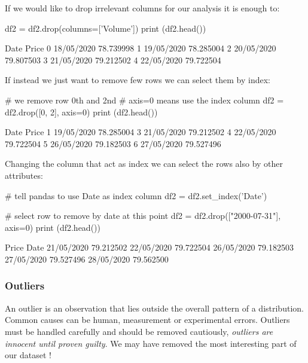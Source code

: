 If we would like to drop irrelevant columns for our analysis it is enough to:

\begin{ipython}
df2 = df2.drop(columns=['Volume'])
print (df2.head())
\end{ipython}
\begin{ioutput}
         Date      Price
0  18/05/2020  78.739998
1  19/05/2020  78.285004
2  20/05/2020  79.807503
3  21/05/2020  79.212502
4  22/05/2020  79.722504
\end{ioutput}
        
If instead we just want to remove few rows we can select them by index:

\begin{ipython}
# we remove row 0th and 2nd
# axis=0 means use the index column
df2 = df2.drop([0, 2], axis=0)
print (df2.head())
\end{ipython}
\begin{ioutput}
         Date      Price
1  19/05/2020  78.285004
3  21/05/2020  79.212502
4  22/05/2020  79.722504
5  26/05/2020  79.182503
6  27/05/2020  79.527496
\end{ioutput}
        
Changing the column that act as index we can select the rows also by other attributes:

\begin{ipython}
# tell pandas to use Date as index column
df2 = df2.set_index('Date')

# select row to remove by date at this point
df2 = df2.drop(["2000-07-31"], axis=0)
print (df2.head())
\end{ipython}
\begin{ioutput}
                Price
Date                 
21/05/2020  79.212502
22/05/2020  79.722504
26/05/2020  79.182503
27/05/2020  79.527496
28/05/2020  79.562500
\end{ioutput}
        
\subsubsection{Outliers}\label{outliers}

An outlier is an observation that lies outside the overall pattern of a distribution. Common causes can be human, measurement or experimental errors. Outliers must be handled carefully and should be removed cautiously, \emph{outliers are innocent until proven guilty}. We may have removed the most interesting part of our dataset !

